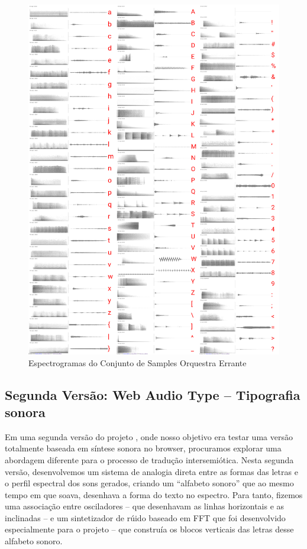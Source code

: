 \begin{figure}[htb]
    \caption{\label{samplesorquestra}Espectrogramas do Conjunto de Samples Orquestra Errante}
    \begin{center}
        \includegraphics[width=0.7\linewidth]{pictures/cap3/bandaorquestra.jpg}
    \end{center}
\end{figure}

\subsection{Segunda Versão: Web Audio Type -- Tipografia sonora}
Em uma segunda versão do projeto \cite{Stolfi2017w}, onde nosso objetivo era testar uma versão totalmente baseada em síntese sonora no browser, procuramos explorar uma abordagem diferente para o processo de tradução intersemiótica. Nesta segunda versão, desenvolvemos um sistema de analogia direta entre as formas das letras e o perfil espectral dos sons gerados, criando um ``alfabeto sonoro'' que ao mesmo tempo em que soava, desenhava a forma do texto no espectro. Para tanto, fizemos uma associação entre osciladores -- que desenhavam as linhas horizontais e as inclinadas -- e um sintetizador de rúido baseado em FFT que foi desenvolvido especialmente para o projeto -- que construía os blocos verticais das letras desse alfabeto sonoro.


